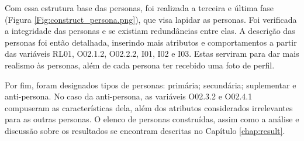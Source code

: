 Com essa estrutura base das personas, foi realizada a terceira e última fase (Figura \ref{Fig:construct_persona.png}), que visa lapidar as personas. Foi verificada a integridade das personas e se existiam redundâncias entre elas. A descrição das personas foi então detalhada, inserindo mais  atributos e comportamentos a partir das variáveis RL01, O02.1.2, O02.2.2, I01, I02 e I03. Estas serviram para dar mais realismo às personas, além de cada persona ter recebido uma foto de perfil. 

Por fim, foram designados tipos de personas: primária; secundária; suplementar e anti-persona. No caso da anti-persona, as variáveis O02.3.2 e O02.4.1 compuseram as características dela, além dos atributos considerados irrelevantes para as outras personas. O elenco de personas construídas, assim como a análise e discussão sobre os resultados se encontram descritas no Capítulo \ref{chap:result}.
